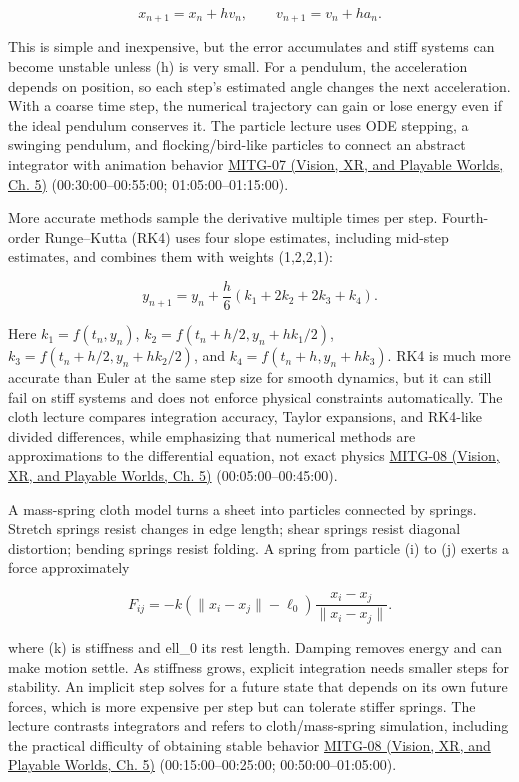 \[
x_{n+1}=x_n+h v_n,\qquad v_{n+1}=v_n+h a_n.
\]

This is simple and inexpensive, but the error accumulates and stiff systems can become unstable unless (h) is very small. For a pendulum, the acceleration depends on position, so each step's estimated angle changes the next acceleration. With a coarse time step, the numerical trajectory can gain or lose energy even if the ideal pendulum conserves it. The particle lecture uses ODE stepping, a swinging pendulum, and flocking/bird-like particles to connect an abstract integrator with animation behavior \href{../07-Vision-XR-and-Playable-Worlds/main.pdf\#nameddest=04-visual-computing-ii-ch036-mitg-07---particle-systems}{MITG-07 (Vision, XR, and Playable Worlds, Ch. 5)} (00:30:00--00:55:00; 01:05:00--01:15:00).

More accurate methods sample the derivative multiple times per step. Fourth-order Runge--Kutta (RK4) uses four slope estimates, including mid-step estimates, and combines them with weights (1,2,2,1):

\[
y_{n+1}=y_n+\frac{h}{6}(k_1+2k_2+2k_3+k_4).
\]

Here \(k_1=f(t_n,y_n)\), \(k_2=f(t_n+h/2,y_n+hk_1/2)\), \(k_3=f(t_n+h/2,y_n+hk_2/2)\), and \(k_4=f(t_n+h,y_n+hk_3)\). RK4 is much more accurate than Euler at the same step size for smooth dynamics, but it can still fail on stiff systems and does not enforce physical constraints automatically. The cloth lecture compares integration accuracy, Taylor expansions, and RK4-like divided differences, while emphasizing that numerical methods are approximations to the differential equation, not exact physics \href{../07-Vision-XR-and-Playable-Worlds/main.pdf\#nameddest=04-visual-computing-ii-ch036-mitg-08---cloth-simulation}{MITG-08 (Vision, XR, and Playable Worlds, Ch. 5)} (00:05:00--00:45:00).

A mass-spring cloth model turns a sheet into particles connected by springs. Stretch springs resist changes in edge length; shear springs resist diagonal distortion; bending springs resist folding. A spring from particle (i) to (j) exerts a force approximately

\[
F_{ij}=-k(\|x_i-x_j\|-\ell_0)\frac{x_i-x_j}{\|x_i-x_j\|}.
\]

where (k) is stiffness and ell\_0 its rest length. Damping removes energy and can make motion settle. As stiffness grows, explicit integration needs smaller steps for stability. An implicit step solves for a future state that depends on its own future forces, which is more expensive per step but can tolerate stiffer springs. The lecture contrasts integrators and refers to cloth/mass-spring simulation, including the practical difficulty of obtaining stable behavior \href{../07-Vision-XR-and-Playable-Worlds/main.pdf\#nameddest=04-visual-computing-ii-ch036-mitg-08---cloth-simulation}{MITG-08 (Vision, XR, and Playable Worlds, Ch. 5)} (00:15:00--00:25:00; 00:50:00--01:05:00).

